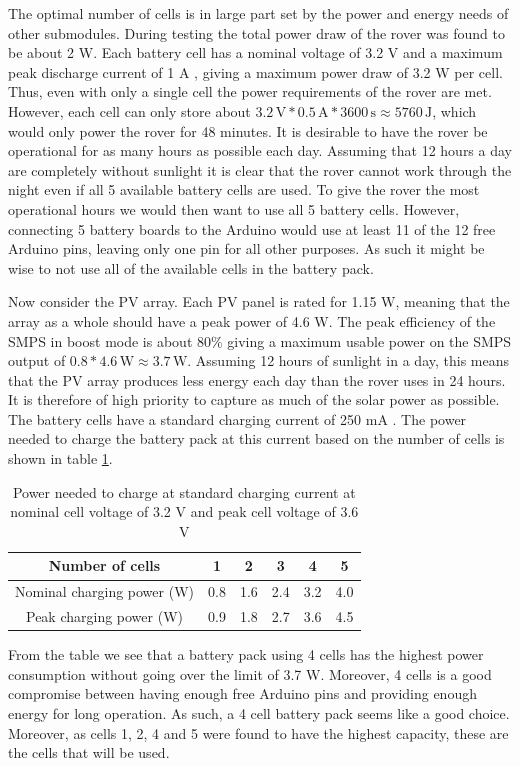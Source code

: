 \documentclass[a4paper]{article}
\newcommand{\unit}[1]{\ensuremath{\, \mathrm{#1}}}
\begin{document}
The optimal number of cells is in large part set by the power and energy 
needs of other submodules. During testing the total power draw of the 
rover was found to be about 2 W. Each battery cell has a nominal voltage 
of 3.2 V and a maximum peak discharge current of 1 A \cite{batteryDatasheet}, 
giving a maximum power draw of 3.2 W per cell. Thus, even with only a 
single cell the power requirements of the rover are met. However, each 
cell can only store about 
\(3.2 \unit{V} * 0.5 \unit{A} * 3600 \unit{s} \approx 5760 \unit{J} \),  
which would only power the rover for 48 minutes. It is desirable to 
have the rover be operational for as many hours as possible each day. 
Assuming that 12 hours a day are completely without sunlight it is 
clear that the rover cannot work through the night even if all 
5 available battery cells are used. To give the rover the most 
operational hours we would then want to use all 5 battery cells. 
However, connecting 5 battery boards to the Arduino would use at 
least 11 of the 12 free Arduino pins, leaving only one pin for 
all other purposes. As such it might be wise to not use all of the 
available cells in the battery pack.

Now consider the PV array. Each PV panel is rated for 1.15 W, meaning that 
the array as a whole should have a peak power of 4.6 W. The peak efficiency 
of the SMPS in boost mode is about 80\% \cite{powerLogbook} giving a maximum usable 
power on the SMPS output of 
\(0.8 * 4.6 \unit{W} \approx 3.7 \unit{W} \). Assuming 12 hours of 
sunlight in a day, this means that the PV array produces less energy 
each day than the rover uses in 24 hours. It is therefore of high 
priority to capture as much of the solar power as possible. The 
battery cells have a standard charging current of  250 mA 
\cite{batteryDatasheet}. The power needed to charge the battery 
pack at this current based on the number of cells is shown in 
table \ref{table:2}. 

\vspace{5pt}
\begin{table}[h!]
    \centering
    \begin{tabular}{||c| c c c c c||} 
        \hline
        Number of cells& 1 & 2 & 3 & 4 & 5 \\ [0.5ex] 
        \hline
        Nominal charging power (W) & 0.8 & 1.6 & 2.4 & 3.2 & 4.0\\ [1ex] 
        \hline
        Peak charging power (W) & 0.9 & 1.8 & 2.7 & 3.6 & 4.5 \\ [1ex] 
        \hline
    \end{tabular}
    \caption{Power needed to charge at standard charging current at nominal cell voltage of 3.2 V and peak cell voltage of 3.6 V}
    \label{table:2}
\end{table}
From the table we see that a battery pack using 4 cells has the highest 
power consumption without going over the limit of 3.7 W. Moreover, 
4 cells is a good compromise between having enough free Arduino 
pins and providing enough energy for long operation. As such,
a 4 cell battery pack seems like a good choice. Moreover, as cells 
1, 2, 4 and 5 were found to have the highest capacity, these 
are the cells that will be used. 
\end{document}
